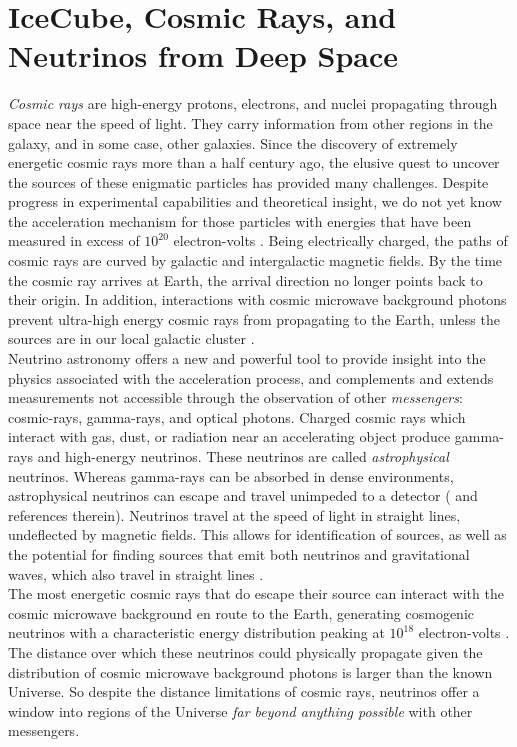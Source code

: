 \documentclass[../../../main.tex]{subfiles}
\begin{document}
\section{IceCube, Cosmic Rays, and Neutrinos from Deep Space}
\label{sec:professional}

\textit{Cosmic rays} are high-energy protons, electrons, and nuclei propagating through space near the speed of light.  They carry information from other regions in the galaxy, and in some case, other galaxies.  Since the discovery of extremely energetic cosmic rays more than a half century ago, the elusive quest to uncover the sources of these enigmatic particles has provided many challenges.  Despite progress in experimental capabilities and theoretical insight, we do not yet know the acceleration mechanism for those particles with energies that have been measured in excess of $10^{20}$ electron-volts \cite{10.1088/1742-6596/1766/1/012002}.  Being electrically charged, the paths of cosmic rays are curved by galactic and intergalactic magnetic fields.  By the time the cosmic ray arrives at Earth, the arrival direction no longer points back to their origin.  In addition, interactions with cosmic microwave background photons prevent ultra-high energy cosmic rays from propagating to the Earth, unless the sources are in our local galactic cluster \cite{PhysRevLett.16.748} \cite{1966JETPL...4...78Z}.
\\
\vspace{0.25cm}
Neutrino astronomy offers a new and powerful tool to provide insight into the physics associated with the acceleration process, and complements and extends measurements not accessible through the observation of other \textit{messengers}: cosmic-rays, gamma-rays, and  optical photons. Charged cosmic rays which interact with gas, dust, or radiation near an accelerating object produce gamma-rays and high-energy neutrinos.  These neutrinos are called \textit{astrophysical} neutrinos. Whereas gamma-rays can be absorbed in dense environments, astrophysical neutrinos can escape and travel unimpeded to a detector (\cite{Astro2020_1} and references therein). Neutrinos travel at the speed of light in straight lines, undeflected by magnetic fields.  This allows for identification of sources, as well as the potential for finding sources that emit both neutrinos and gravitational waves, which also travel in straight lines \cite{10.3847/2041-8213/ab9d24}.
\\
\vspace{0.25cm}
The most energetic cosmic rays that do escape their source can interact with the cosmic microwave background en route to the Earth, generating cosmogenic neutrinos with a characteristic energy distribution peaking at $10^{18}$ electron-volts \cite{10.1007/bf00645585} \cite{BERESINSKY1969423}. The distance over which these neutrinos could physically propagate given the distribution of cosmic microwave background photons is larger than the known Universe.  So despite the distance limitations of cosmic rays, neutrinos offer a window into regions of the Universe \textit{far beyond anything possible} with other messengers.
\end{document}
